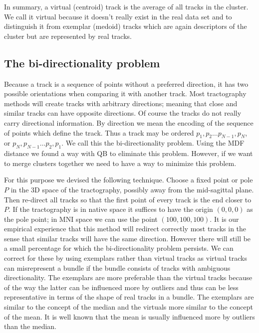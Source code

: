 \documentclass[preprint,authoryear,a4paper,10pt,onecolumn]{elsarticle}
\begin{document}
In summary, a virtual (centroid) track is the average of all tracks in
the cluster. We call it virtual because it doesn't really exist in the
real data set and to distinguish it from exemplar (medoid) tracks which
are again descriptors of the cluster but are represented by real tracks.


\subsection{The bi-directionality problem\label{sub:The-bi-directionality-problem}}

Because a track is a sequence of points without a preferred direction,
it has two possible orientations when comparing it with another track.
Most tractography methods will create tracks with arbitrary directions;
meaning that close and similar tracks can have opposite directions.  Of
course the tracks do not really carry directional information.  By
direction we mean the encoding of the sequence of points which define
the track. Thus a track may be ordered $p_{1},p_{2}\ldots
p_{N-1},p_{N}$, or $p_{N},p_{N-1}\ldots p_{2},p_{1}$. We call this the
bi-directionality problem. Using the MDF distance we found a way with QB
to eliminate this problem. However, if we want to merge clusters
together we need to have a way to minimize this problem.

For this purpose we devised the following technique. Choose a fixed
point or pole $P$ in the 3D space of the tractography, possibly away
from the mid-sagittal plane. Then re-direct all tracks so that the first
point of every track is the end closer to $P$. If the tractography is in
native space it suffices to have the origin $(0,0,0)$ as the pole point;
in MNI space we can use the point $(100,100,100)$. It is our empirical
experience that this method will redirect correctly most tracks in the
sense that similar tracks will have the same direction.  However there
will still be a small percentage for which the bi-directionality problem
persists. We can correct for these by using exemplars rather than
virtual tracks as virtual tracks can misrepresent a bundle if the bundle
consists of tracks with ambiguous directionality. The exemplars are more
preferable than the virtual tracks because of the way the latter can be
influenced more by outliers and thus can be less representative in terms
of the shape of real tracks in a bundle. The exemplars are similar to
the concept of the median and the virtuals more similar to the concept
of the mean. It is well known that the mean is usually influenced more
by outliers than the median.
\end{document}
